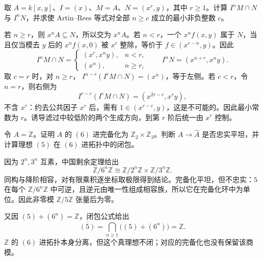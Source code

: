 \begin{exercise}\label{g5:ex:artin-rees-shift}
	取 \(A=k[x,y]\)、\(I=(x)\)、\(M=A\)、\(N=(x^r,y)\)，其中 \(r\geq1\)。计算 \(I^nM\cap N\) 与 \(I^nN\)，并求使 Artin–Rees 等式对全部 \(n\geq c\) 成立的最小非负整数 \(c\)。
\end{exercise}
\begin{solution}
	若 \(n\geq r\)，则 \(x^nA\subseteq N\)，所以交为 \(x^nA\)。若 \(n<r\)，一个 \(x^nf(x,y)\) 属于 \(N\)，当且仅当模去 \(y\) 后的 \(x^nf(x,0)\) 被 \(x^r\) 整除，等价于 \(f\in(x^{r-n},y)\)。因此
	\[
		I^nM\cap N=
		\begin{cases}
			(x^r,x^ny),&n<r,\\
			(x^n),&n\geq r,
		\end{cases}
		\qquad
		I^nN=(x^{n+r},x^ny).
	\]
	取 \(c=r\) 时，对 \(n\geq r\)，
	\(I^{n-r}(I^rM\cap N)=(x^n)\)，等于左侧。若 \(c<r\)，令 \(n=r\)，则右侧为
	\[
		I^{r-c}(I^cM\cap N)=(x^{2r-c},x^ry),
	\]
	不含 \(x^r\)：约去公共因子 \(x^r\) 后，需有 \(1\in(x^{r-c},y)\)，这是不可能的。因此最小常数为 \(r\)。诱导滤过中较低阶的两个生成方向，到第 \(r\) 阶后统一由 \(x^r\) 控制。
\end{solution}

\begin{exercise}\label{g5:ex:six-adic-completion}
	令 \(A=\mathbb Z\)。证明 \(A\) 的 \((6)\) 进完备化为
	\(\mathbb Z_2\times\mathbb Z_3\)。判断 \(A\to\widehat A\) 是否忠实平坦，并计算理想 \((5)\) 在 \((6)\) 进拓扑中的闭包。
\end{exercise}
\begin{solution}
	因为 \(2^n,3^n\) 互素，中国剩余定理给出
	\[
		\mathbb Z/6^n\mathbb Z
		\cong\mathbb Z/2^n\mathbb Z\times\mathbb Z/3^n\mathbb Z.
	\]
	同构与降阶相容，对有限乘积逐坐标取极限得到结论。完备化平坦，但不忠实：\(5\) 在每个 \(\mathbb Z/6^n\mathbb Z\) 中可逆，且逆元由唯一性组成相容族，所以它在完备化环中为单位。因此非零模 \(\mathbb Z/5\mathbb Z\) 张量后为零。

	又因 \((5)+(6^n)=\mathbb Z\)，闭包公式给出
	\[
		\overline{(5)}=\bigcap_{n\geq1}\bigl((5)+(6^n)\bigr)=\mathbb Z.
	\]
	\(\mathbb Z\) 的 \((6)\) 进拓扑本身分离，但这个真理想不闭；对应的完备化也没有保留该商模。
\end{solution}

